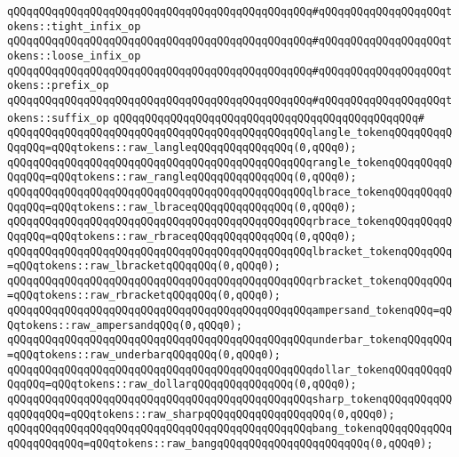 \verb|qQQqqQQqqQQqqQQqqQQqqQQqqQQqqQQqqQQqqQQqqQQqqQQq#qQQqqQQqqQQqqQQqqQQqtokens::tight_infix_op|\newline
\verb|qQQqqQQqqQQqqQQqqQQqqQQqqQQqqQQqqQQqqQQqqQQqqQQq#qQQqqQQqqQQqqQQqqQQqtokens::loose_infix_op|\newline
\verb|qQQqqQQqqQQqqQQqqQQqqQQqqQQqqQQqqQQqqQQqqQQqqQQq#qQQqqQQqqQQqqQQqqQQqtokens::prefix_op|\newline
\verb|qQQqqQQqqQQqqQQqqQQqqQQqqQQqqQQqqQQqqQQqqQQqqQQq#qQQqqQQqqQQqqQQqqQQqtokens::suffix_op|\newline
\verb|qQQqqQQqqQQqqQQqqQQqqQQqqQQqqQQqqQQqqQQqqQQqqQQq#|\newline
\verb|qQQqqQQqqQQqqQQqqQQqqQQqqQQqqQQqqQQqqQQqqQQqqQQqlangle_tokenqQQqqQQqqQQqqQQq=qQQqtokens::raw_langleqQQqqQQqqQQqqQQq(0,qQQq0);|\newline
\verb|qQQqqQQqqQQqqQQqqQQqqQQqqQQqqQQqqQQqqQQqqQQqqQQqrangle_tokenqQQqqQQqqQQqqQQq=qQQqtokens::raw_rangleqQQqqQQqqQQqqQQq(0,qQQq0);|\newline
\verb|qQQqqQQqqQQqqQQqqQQqqQQqqQQqqQQqqQQqqQQqqQQqqQQqlbrace_tokenqQQqqQQqqQQqqQQq=qQQqtokens::raw_lbraceqQQqqQQqqQQqqQQq(0,qQQq0);|\newline
\verb|qQQqqQQqqQQqqQQqqQQqqQQqqQQqqQQqqQQqqQQqqQQqqQQqrbrace_tokenqQQqqQQqqQQqqQQq=qQQqtokens::raw_rbraceqQQqqQQqqQQqqQQq(0,qQQq0);|\newline
\verb|qQQqqQQqqQQqqQQqqQQqqQQqqQQqqQQqqQQqqQQqqQQqqQQqlbracket_tokenqQQqqQQq=qQQqtokens::raw_lbracketqQQqqQQq(0,qQQq0);|\newline
\verb|qQQqqQQqqQQqqQQqqQQqqQQqqQQqqQQqqQQqqQQqqQQqqQQqrbracket_tokenqQQqqQQq=qQQqtokens::raw_rbracketqQQqqQQq(0,qQQq0);|\newline
\newline
\verb|qQQqqQQqqQQqqQQqqQQqqQQqqQQqqQQqqQQqqQQqqQQqqQQqampersand_tokenqQQq=qQQqtokens::raw_ampersandqQQq(0,qQQq0);|\newline
\verb|qQQqqQQqqQQqqQQqqQQqqQQqqQQqqQQqqQQqqQQqqQQqqQQqunderbar_tokenqQQqqQQq=qQQqtokens::raw_underbarqQQqqQQq(0,qQQq0);|\newline
\verb|qQQqqQQqqQQqqQQqqQQqqQQqqQQqqQQqqQQqqQQqqQQqqQQqdollar_tokenqQQqqQQqqQQqqQQq=qQQqtokens::raw_dollarqQQqqQQqqQQqqQQq(0,qQQq0);|\newline
\verb|qQQqqQQqqQQqqQQqqQQqqQQqqQQqqQQqqQQqqQQqqQQqqQQqsharp_tokenqQQqqQQqqQQqqQQqqQQq=qQQqtokens::raw_sharpqQQqqQQqqQQqqQQqqQQq(0,qQQq0);|\newline
\verb|qQQqqQQqqQQqqQQqqQQqqQQqqQQqqQQqqQQqqQQqqQQqqQQqbang_tokenqQQqqQQqqQQqqQQqqQQqqQQq=qQQqtokens::raw_bangqQQqqQQqqQQqqQQqqQQqqQQq(0,qQQq0);|\newline
